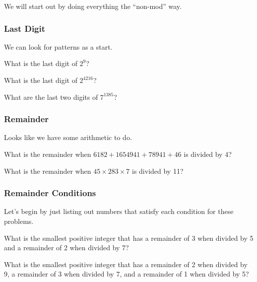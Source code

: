   We will start out by doing everything the ``non-mod'' way.
			\subsubsection{Last Digit}
				We can look for patterns as a start. \par
				\begin{problem} What is the last digit of $2^{9}$? \end{problem} \vspace{0.2in}

				\begin{problem} What is the last digit of $2^{4216}$? \end{problem} \vspace{0.2in}

				\begin{problem} What are the last two digits of $7^{1385}$? \end{problem}\vspace{0.2in}

			\subsubsection{Remainder}
				Looks like we have some arithmetic to do. \par
				\begin{problem} What is the remainder when $6182+1654941+78941+46$ is divided by 4?\end{problem}\vspace{0.5in}
				\begin{problem} What is the remainder when $45 \times 283 \times 7$ is divided by 11?\end{problem}\vspace{0.5in}
			\subsubsection{Remainder Conditions}
				Let's begin by just listing out numbers that satisfy each condition for these problems. \par
				\begin{problem} What is the smallest positive integer that has a remainder of 3 when divided by 5 and a remainder of 2 when divided by 7?\end{problem}\vspace{1in}

				\begin{problem} What is the smallest positive integer that has a remainder of 2 when divided by 9, a remainder of 3 when divided by 7, and a remainder of 1 when divided by 5?\end{problem}\vspace{1in}

